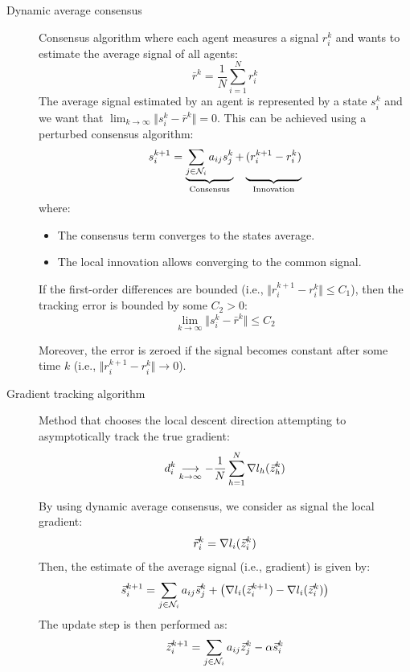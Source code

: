 \begin{description}
    \item[Dynamic average consensus] 
        Consensus algorithm where each agent measures a signal $r_i^k$ and wants to estimate the average signal of all agents:
        \[ \bar{r}^k = \frac{1}{N} \sum_{i=1}^{N} r_i^k \]
        The average signal estimated by an agent is represented by a state $s_i^k$ and we want that $\lim_{k \rightarrow \infty} \Vert s_i^k - \bar{r}^k \Vert = 0$. This can be achieved using a perturbed consensus algorithm:
        \[ 
            s_i^{k+1} = 
            \underbrace{\sum_{j \in \mathcal{N}_i} a_{ij} s_j^k}_{\text{Consensus}} +
            \underbrace{\vphantom{\sum_{j \in \mathcal{N}_i}}(r_i^{k+1} - r_i^k)}_{\text{Innovation}}
        \]
        where:
        \begin{itemize}
            \item The consensus term converges to the states average.
            \item The local innovation allows converging to the common signal.
        \end{itemize}

        \begin{theorem}
            If the first-order differences are bounded (i.e., $\Vert r_i^{k+1} - r_i^{k} \Vert \leq C_1$), then the tracking error is bounded by some $C_2 > 0$:
            \[ \lim_{k \rightarrow \infty} \Vert s_i^k - \bar{r}^k \Vert \leq C_2 \]

            Moreover, the error is zeroed if the signal becomes constant after some time $k$ (i.e., $\Vert r_i^{k+1} - r_i^{k} \Vert \rightarrow 0$).
        \end{theorem}

    \item[Gradient tracking algorithm] 
        Method that chooses the local descent direction attempting to asymptotically track the true gradient:
        \[ d_i^k \underset{k \rightarrow \infty}{\longrightarrow} - \frac{1}{N} \sum_{h=1}^N \nabla l_h({\vec{z}}_h^k) \] 

        By using dynamic average consensus, we consider as signal the local gradient:
        \[ \vec{r}_i^k = \nabla l_i({\vec{z}}_i^k) \]
        Then, the estimate of the average signal (i.e., gradient) is given by:
        \[
            \vec{s}_i^{k+1} = \sum_{j \in \mathcal{N}_i} a_{ij} \vec{s}_j^k + \left( \nabla l_i({\vec{z}}_i^{k+1}) - \nabla l_i({\vec{z}}_i^k) \right)
        \]
        The update step is then performed as:
        \[ {\vec{z}}_i^{k+1} = \sum_{j \in \mathcal{N}_i} a_{ij} {\vec{z}}_j^k - \alpha \vec{s}_i^k \]


\end{description}

